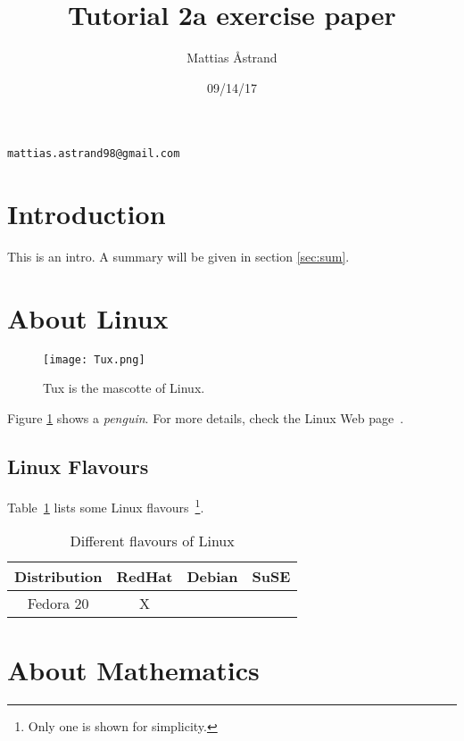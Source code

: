 \documentclass[a4paper,10pt,twoside]{article}
\author{Mattias Åstrand}
\title{Tutorial 2a exercise paper}
\date{09/14/17}
\begin{document}
\maketitle

\begin{center}
 \texttt{mattias.astrand98@gmail.com}
\end{center}

\section{Introduction}
\label{sec:intro}
This is an intro. A summary will be given in section \ref{sec:sum}.

\section{About Linux}
\label{sec:linux}

\begin{figure}[h]
\begin{center}
  \texttt{[image: Tux.png]}
  \caption{Tux is the mascotte of Linux.}
  \label{fig:penguin}
\end{center}
\end{figure}

Figure \ref{fig:penguin} shows a \textit{penguin}. For more details, check the Linux Web page~\cite{linux}.

\subsection{Linux Flavours}
\label{sec:Flavours}

Table~\ref{tab:flavours} lists some Linux flavours~\footnote{Only one is shown for simplicity.}.

\begin{table}[h]
\begin{center}
 \begin{tabular}{c|c|c|c}
 
  \hline \hline \textbf{Distribution}&RedHat&Debian&SuSE\\ \hline
	Fedora 20	&  X   &     &    \\ \hline \hline
	
 \end{tabular}
 \caption{Different flavours of Linux}
 \label{tab:flavours}
\end{center}
\end{table}

\section{About Mathematics}
\label{sec:math}
\end{document}
